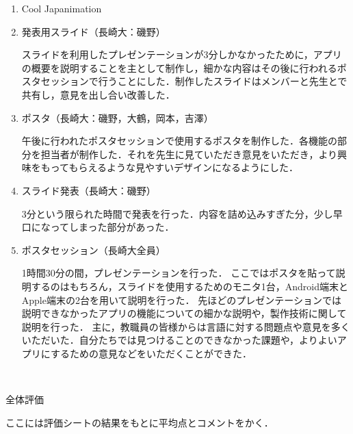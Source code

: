 \begin{enumerate}
\item Cool Japanimation
\par
\item 発表用スライド（長崎大：磯野）
\par
スライドを利用したプレゼンテーションが3分しかなかったために，アプリの概要を説明することを主として制作し，細かな内容はその後に行われるポスタセッションで行うことにした．制作したスライドはメンバーと先生とで共有し，意見を出し合い改善した．
\item ポスタ（長崎大：磯野，大鶴，岡本，吉澤）
\par
午後に行われたポスタセッションで使用するポスタを制作した．各機能の部分を担当者が制作した．それを先生に見ていただき意見をいただき，より興味をもってもらえるような見やすいデザインになるようにした．
\item スライド発表（長崎大：磯野）
\par
3分という限られた時間で発表を行った．内容を詰め込みすぎた分，少し早口になってしまった部分があった．
\item ポスタセッション（長崎大全員）
\par
1時間30分の間，プレゼンテーションを行った．
ここではポスタを貼って説明するのはもちろん，スライドを使用するためのモニタ1台，Android端末とApple端末の2台を用いて説明を行った．
先ほどのプレゼンテーションでは説明できなかったアプリの機能についての細かな説明や，製作技術に関して説明を行った．
主に，教職員の皆様からは言語に対する問題点や意見を多くいただいた．自分たちでは見つけることのできなかった課題や，よりよいアプリにするための意見などをいただくことができた．
\end{enumerate}　
\par
全体評価
\par
ここには評価シートの結果をもとに平均点とコメントをかく．
